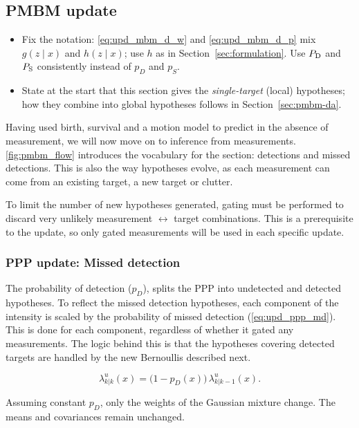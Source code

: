 \subsection{PMBM update}
\label{sec:pmbm-update}
\begin{itemize}
    \item Fix the notation: \autoref{eq:upd_mbm_d_w} and \autoref{eq:upd_mbm_d_p} mix $g(z \mid x)$ and $h(z \mid x)$; use $h$ as in Section~\ref{sec:formulation}. Use $P_{\mathrm{D}}$ and $P_{\mathrm{S}}$ consistently instead of $p_D$ and $p_S$.
    \item State at the start that this section gives the \emph{single-target} (local) hypotheses; how they combine into global hypotheses follows in Section~\ref{sec:pmbm-da}.
\end{itemize}

Having used birth, survival and a motion model to predict in the absence of measurement, we will now move on to inference from measurements. \autoref{fig:pmbm_flow} introduces the vocabulary for the section: detections and missed detections. This is also the way hypotheses evolve, as each measurement can come from an existing target, a new target or clutter. 
\medskip

To limit the number of new hypotheses generated, gating must be performed to discard very unlikely measurement $\leftrightarrow$ target combinations. This is a prerequisite to the update, so only gated measurements will be used in each specific update.
\medskip

\subsubsection{PPP update: Missed detection}
The probability of detection ($p_D$), splits the PPP into undetected and detected hypotheses. To reflect the missed detection hypotheses, each component of the intensity is scaled by the probability of missed detection (\autoref{eq:upd_ppp_md}). This is done for each component, regardless of whether it gated any measurements. The logic behind this is that the hypotheses covering detected targets are handled by the new Bernoullis described next.

\begin{equation}
  \lambda^u_{k|k}(x) = \big(1 - p_D(x)\big)\, \lambda^u_{k|k-1}(x).
  \label{eq:upd_ppp_md}
\end{equation}

Assuming constant $p_D$, only the weights of the Gaussian mixture change. The means and covariances remain unchanged. 


